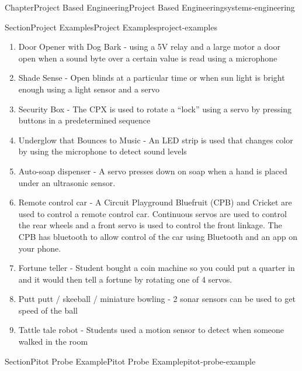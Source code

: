 \documentclass[oneside,10pt,]{book}
\numberwithin{equation}{section}
\begin{document}
\begin{chapterptx}{Chapter}{Project Based Engineering}{}{Project Based Engineering}{}{}{systems-engineering}
\begin{sectionptx}{Section}{Project Examples}{}{Project Examples}{}{}{project-examples}
\begin{enumerate}
\item{}Door Opener with Dog Bark - using a 5V relay and a large motor a door open when a sound byte over a certain value is read using a microphone%
\item{}Shade Sense - Open blinds at a particular time or when sun light is bright enough using a light sensor and a servo%
\item{}Security Box - The CPX is used to rotate a “lock” using a servo by pressing buttons in a predetermined sequence%
\item{}Underglow that Bounces to Music - An LED strip is used that changes color by using the microphone to detect sound levels%
\item{}Auto-soap dispenser - A servo presses down on soap when a hand is placed under an ultrasonic sensor.%
\item{}Remote control car - A Circuit Playground Bluefruit (CPB) and Cricket are used to control a remote control car. Continuous servos are used to control the rear wheels and a front servo is used to control the front linkage. The CPB has bluetooth to allow control of the car using Bluetooth and an app on your phone.%
\item{}Fortune teller - Student bought a coin machine so you could put a quarter in and it would then tell a fortune by rotating one of 4 servos.%
\item{}Putt putt \slash{} skeeball \slash{} miniature bowling - 2 sonar sensors can be used to get speed of the ball%
\item{}Tattle tale robot - Students used a motion sensor to detect when someone walked in the room%
\end{enumerate}
%
\end{sectionptx}
%
%
\typeout{************************************************}
\typeout{************************************************}
%
\begin{sectionptx}{Section}{Pitot Probe Example}{}{Pitot Probe Example}{}{}{pitot-probe-example}
\begin{introduction}{}%

\end{introduction}
\end{sectionptx}
\end{chapterptx}
\end{document}
